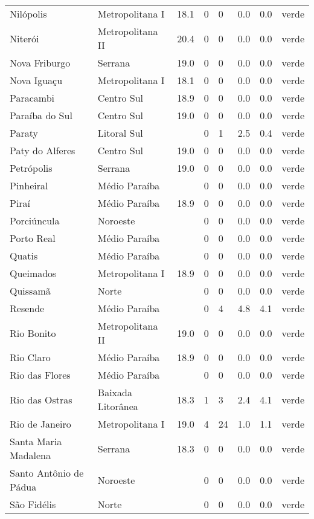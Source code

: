 \begin{longtable}{l|lllllll}
  Nilópolis & Metropolitana I & 18.1 & 0 & 0 & 0.0 & 0.0 & verde \\ 
  Niterói & Metropolitana II & 20.4 & 0 & 0 & 0.0 & 0.0 & verde \\ 
  Nova Friburgo & Serrana & 19.0 & 0 & 0 & 0.0 & 0.0 & verde \\ 
  Nova Iguaçu & Metropolitana I & 18.1 & 0 & 0 & 0.0 & 0.0 & verde \\ 
  Paracambi & Centro Sul & 18.9 & 0 & 0 & 0.0 & 0.0 & verde \\ 
  Paraíba do Sul & Centro Sul & 19.0 & 0 & 0 & 0.0 & 0.0 & verde \\ 
  Paraty & Litoral Sul &  & 0 & 1 & 2.5 & 0.4 & verde \\ 
  Paty do Alferes & Centro Sul & 19.0 & 0 & 0 & 0.0 & 0.0 & verde \\ 
  Petrópolis & Serrana & 19.0 & 0 & 0 & 0.0 & 0.0 & verde \\ 
  Pinheiral & Médio Paraíba &  & 0 & 0 & 0.0 & 0.0 & verde \\ 
  Piraí & Médio Paraíba & 18.9 & 0 & 0 & 0.0 & 0.0 & verde \\ 
  Porciúncula & Noroeste &  & 0 & 0 & 0.0 & 0.0 & verde \\ 
  Porto Real & Médio Paraíba &  & 0 & 0 & 0.0 & 0.0 & verde \\ 
  Quatis & Médio Paraíba &  & 0 & 0 & 0.0 & 0.0 & verde \\ 
  Queimados & Metropolitana I & 18.9 & 0 & 0 & 0.0 & 0.0 & verde \\ 
  Quissamã & Norte &  & 0 & 0 & 0.0 & 0.0 & verde \\ 
  Resende & Médio Paraíba &  & 0 & 4 & 4.8 & 4.1 & verde \\ 
  Rio Bonito & Metropolitana II & 19.0 & 0 & 0 & 0.0 & 0.0 & verde \\ 
  Rio Claro & Médio Paraíba & 18.9 & 0 & 0 & 0.0 & 0.0 & verde \\ 
  Rio das Flores & Médio Paraíba &  & 0 & 0 & 0.0 & 0.0 & verde \\ 
  Rio das Ostras & Baixada Litorânea & 18.3 & 1 & 3 & 2.4 & 4.1 & verde \\ 
  Rio de Janeiro & Metropolitana I & 19.0 & 4 & 24 & 1.0 & 1.1 & verde \\ 
  Santa Maria Madalena & Serrana & 18.3 & 0 & 0 & 0.0 & 0.0 & verde \\ 
  Santo Antônio de Pádua & Noroeste &  & 0 & 0 & 0.0 & 0.0 & verde \\ 
  São Fidélis & Norte &  & 0 & 0 & 0.0 & 0.0 & verde \\ 

\end{longtable}
